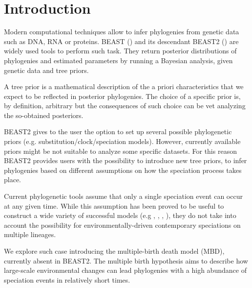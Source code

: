 \section{Introduction}

Modern computational techniques allow to infer phylogenies from genetic data 
such as DNA, RNA or proteins. BEAST (\cite{beast}) and its descendant 
BEAST2 (\cite{beast2}) are widely used tools to perform such task. They 
return posterior distributions of phylogenies 
and estimated parameters by running a Bayesian analysis, 
given genetic data and tree priors. 

A tree prior is a mathematical description 
of the a priori characteristics 
that we expect to be reflected in posterior phylogenies. 
The choice of a specific prior is, by definition, 
arbitrary but the consequences of such choice 
can be vet analyzing the so-obtained posteriors.

BEAST2 gives to the user the option to set up 
several possible phylogenetic 
priors (e.g. substitution/clock/speciation models). 
However, currently available priors 
might be not suitable to analyze some specific datasets.
For this reason BEAST2 provides users with the possibility 
to introduce new tree priors, 
to infer phylogenies based on different assumptions 
on how the speciation process takes place.

Current phylogenetic tools assume that 
only a single speciation event can occur at any given time.
While this assumption has been proved to be useful 
to construct a wide variety of successful 
models (e.g \cite{Maddison2007biSSE}, \cite{Valente2015}, 
\cite{etienne2012diversity}, \cite{etienne2014estimating}), 
they do not take into account the possibility 
for environmentally-driven contemporary speciations on multiple lineages.

We explore such case introducing the multiple-birth death model (MBD), 
currently absent in BEAST2. 
The multiple birth hypothesis aims to describe how 
large-scale environmental changes can lead phylogenies 
with a high abundance of speciation events in relatively short times.

\iffalse
\giovanni{This might be good for the abstract}
The (constant-rate) birth-death (BD) model embodies the common assumption 
that only a single speciation event can occur at any given time. 
The multiple-birth-death (MBD) model relaxes this assumption allowing, 
in addition to standard BD events, 
also events in which large-scale environmental changes lead 
to speciation bursts.
\fi

